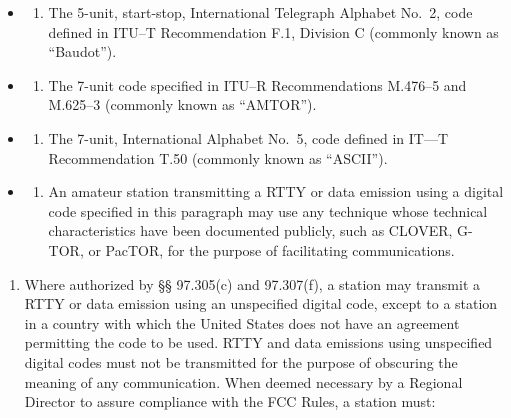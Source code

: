 \documentclass[
  letterpaper,
  DIV=11,
  numbers=noendperiod]{scrreport}
\providecommand{\tightlist}{%
  \setlength{\itemsep}{0pt}\setlength{\parskip}{0pt}}\usepackage{longtable,booktabs,array}
\begin{document}
\begin{itemize}
\item
  \begin{enumerate}
  \def\labelenumi{(\arabic{enumi})}
  \tightlist
  \item
    The 5-unit, start-stop, International Telegraph Alphabet No.~2, code
    defined in ITU--T Recommendation F.1, Division C (commonly known as
    ``Baudot'').
  \end{enumerate}
\item
  \begin{enumerate}
  \def\labelenumi{(\arabic{enumi})}
  \setcounter{enumi}{1}
  \tightlist
  \item
    The 7-unit code specified in ITU--R Recommendations M.476--5 and
    M.625--3 (commonly known as ``AMTOR'').
  \end{enumerate}
\item
  \begin{enumerate}
  \def\labelenumi{(\arabic{enumi})}
  \setcounter{enumi}{2}
  \tightlist
  \item
    The 7-unit, International Alphabet No.~5, code defined in IT---T
    Recommendation T.50 (commonly known as ``ASCII'').
  \end{enumerate}
\item
  \begin{enumerate}
  \def\labelenumi{(\arabic{enumi})}
  \setcounter{enumi}{3}
  \tightlist
  \item
    An amateur station transmitting a RTTY or data emission using a
    digital code specified in this paragraph may use any technique whose
    technical characteristics have been documented publicly, such as
    CLOVER, G-TOR, or PacTOR, for the purpose of facilitating
    communications.
  \end{enumerate}
\end{itemize}

\begin{enumerate}
\def\labelenumi{(\alph{enumi})}
\setcounter{enumi}{1}
\tightlist
\item
  Where authorized by §§ 97.305(c) and 97.307(f), a station may transmit
  a RTTY or data emission using an unspecified digital code, except to a
  station in a country with which the United States does not have an
  agreement permitting the code to be used. RTTY and data emissions
  using unspecified digital codes must not be transmitted for the
  purpose of obscuring the meaning of any communication. When deemed
  necessary by a Regional Director to assure compliance with the FCC
  Rules, a station must:
\end{enumerate}
\end{document}
